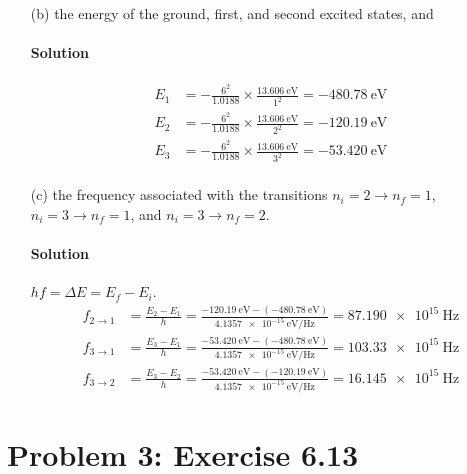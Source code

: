 \documentclass{article}
\numberwithin{equation}{section}
\begin{document}
\begin{enumerate}
\clearpage
        
		\item[(b)] the energy of the ground, first, and second excited states, and
		\paragraph{Solution}
        \begin{align}
            E_1 &= - \frac{6^2}{\num{1.0188}} \times \frac{\qty{13.606}{\electronvolt}}{1^2} = \boxed{\qty{-480.78}{\electronvolt}} \\
            E_2 &= - \frac{6^2}{\num{1.0188}} \times \frac{\qty{13.606}{\electronvolt}}{2^2} = \boxed{\qty{-120.19}{\electronvolt}} \\
            E_3 &= - \frac{6^2}{\num{1.0188}} \times \frac{\qty{13.606}{\electronvolt}}{3^2} = \boxed{\qty{-53.420}{\electronvolt}} \\
        \end{align}
		
		\item[(c)] the frequency associated with the transitions $n_i = 2 \to n_f = 1$, $n_i = 3 \to n_f = 1$, and $n_i = 3 \to n_f = 2$.
		\paragraph{Solution} $hf = \Delta E = E_f - E_i$.
        \begin{align}
            f_{2\to1} &= \frac{E_2 - E_1}{h} = \frac{\qty{-120.19}{\electronvolt} - (\qty{-480.78}{\electronvolt})}{\qty{4.1357e-15}{\electronvolt\per\hertz}} = \boxed{\qty{87.190e15}{\hertz}} \\
            f_{3\to1} &= \frac{E_3 - E_1}{h} = \frac{\qty{-53.420}{\electronvolt} - (\qty{-480.78}{\electronvolt})}{\qty{4.1357e-15}{\electronvolt\per\hertz}} = \boxed{\qty{103.33e15}{\hertz}} \\
            f_{3\to2} &= \frac{E_3 - E_2}{h} = \frac{\qty{-53.420}{\electronvolt} - (\qty{-120.19}{\electronvolt})}{\qty{4.1357e-15}{\electronvolt\per\hertz}} = \boxed{\qty{16.145e15}{\hertz}}
        \end{align}
		
	\end{enumerate}
	
\clearpage
	
	\section{Problem 3: Exercise 6.13}
	
\end{document}
